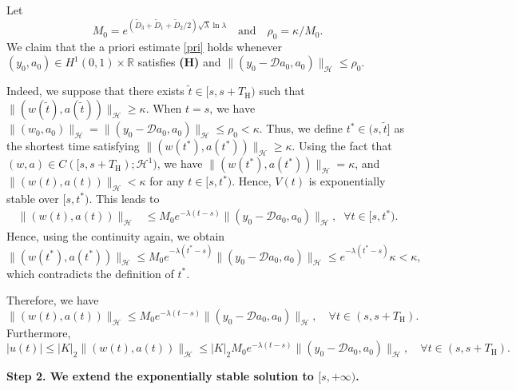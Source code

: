 \documentclass[a4paper]{article}
\numberwithin{equation}{section}
\begin{document}
Let $$M_0=e^{(\tilde{D}_3+\tilde{D}_1+\tilde{D}_2 /2)\sqrt{\lambda}\ln\lambda}\quad\text{and}\quad \rho_0={{{\kappa}}/{M_0}}.$$ 
We claim that the a priori estimate \eqref{pri} holds whenever $(y_0,a_0)\in H^1(0,1)\times\mathbb{R}$ satisfies \textbf{(H)} and $\|(y_0-\mathcal{D}a_0,a_0)\|_{\mathcal{H}}\le \rho_0$. 

Indeed, we suppose that there exists $\tilde{t}\in [s,s+T_{\text{H}})$ such that $\|(w(\tilde t),a(\tilde t))\|_{\mathcal{H}}\ge \kappa$. When $t=s$, we have
$\|(w_0,a_0)\|_{\mathcal{H}}=\|(y_0-\mathcal{D}a_0,a_0)\|_{\mathcal{H}}\le \rho_0<\kappa$. Thus, we define $t^*\in(s, \tilde{t}]$ as the shortest time satisfying
$\|(w(t^*),a(t^*))\|_{\mathcal{H}}\ge\kappa$. Using the fact that $(w,a)\in C([s,s+T_{\text{H}});\mathcal{H}^1)$, we have $\|(w(t^*),a(t^*))\|_{\mathcal{H}}=\kappa$, and $\|(w(t),a(t))\|_{\mathcal{H}}<\kappa$ for any $t\in [s,t^*)$. Hence, $V(t)$ is exponentially stable over $[s,{t}^*)$. This leads to
\begin{equation*}
\begin{aligned}
\|(w(t),a(t))\|_{\mathcal{H}}&\le M_0e^{-\lambda (t-s)}\|(y_0-\mathcal{D}a_0,a_0)\|_{\mathcal{H}},\;\;\forall t\in[s,{t}^*).
\end{aligned}
\end{equation*}
Hence, using the continuity again, we obtain
\begin{equation*}
\|(w(t^*),a(t^*))\|_{\mathcal{H}}\le M_0e^{-\lambda (t^*-s)}\|(y_0-\mathcal{D}a_0,a_0)\|_{\mathcal{H}} \le e^{-\lambda (t^*-s)}\kappa<\kappa,
\end{equation*}
which contradicts the definition of $t^*$. 

Therefore, we have
\begin{equation} \label{y-est-l2}
\|(w(t),a(t))\|_{\mathcal{H}}\le M_0e^{-\lambda(t-s)}\|(y_0-\mathcal{D}a_0,a_0)\|_{\mathcal{H}},\quad\forall t\in(s,s+T_{\text{H}}).
\end{equation} Furthermore, 
\begin{equation}\label{y-est-l222}
|u(t)|\le |K|_2\|(w(t),a(t))\|_{\mathcal{H}}\le |K|_2M_0e^{-\lambda(t-s)}\|(y_0-\mathcal{D}a_0,a_0)\|_{\mathcal{H}},\quad\forall t\in(s,s+T_{\text{H}}).
\end{equation} 

\noindent\textbf{Step 2. We extend the exponentially stable solution to $[s,+\infty)$.}\\[-2mm]
\end{document}
